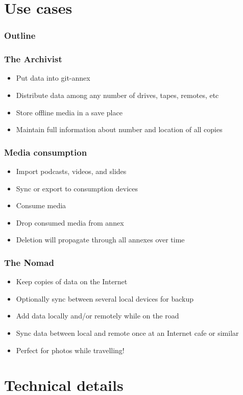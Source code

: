 \documentclass[t]{beamer}
\begin{document}
\section{Use cases}

\begin{frame}
	\frametitle{Outline}
	\tableofcontents[currentsection]
\end{frame}

\begin{frame}
	\frametitle{The Archivist}
	\begin{itemize}
		\item Put data into git-annex
		\item Distribute data among any number of drives, tapes, remotes, etc
		\item Store offline media in a save place
		\item Maintain full information about number and location of all copies
	\end{itemize}
\end{frame}

\begin{frame}
	\frametitle{Media consumption}
	\begin{itemize}
		\item Import podcasts, videos, and slides
		\item Sync or export to consumption devices
		\item Consume media
		\item Drop consumed media from annex
		\item Deletion will propagate through all annexes over time
	\end{itemize}
\end{frame}

\begin{frame}
	\frametitle{The Nomad}
	\begin{itemize}
		\item Keep copies of data on the Internet
		\item Optionally sync between several local devices for backup
		\item Add data locally and/or remotely while on the road
		\item Sync data between local and remote once at an Internet cafe or similar
		\item Perfect for photos while travelling!
	\end{itemize}
\end{frame}


\section{Technical details}
\end{document}
